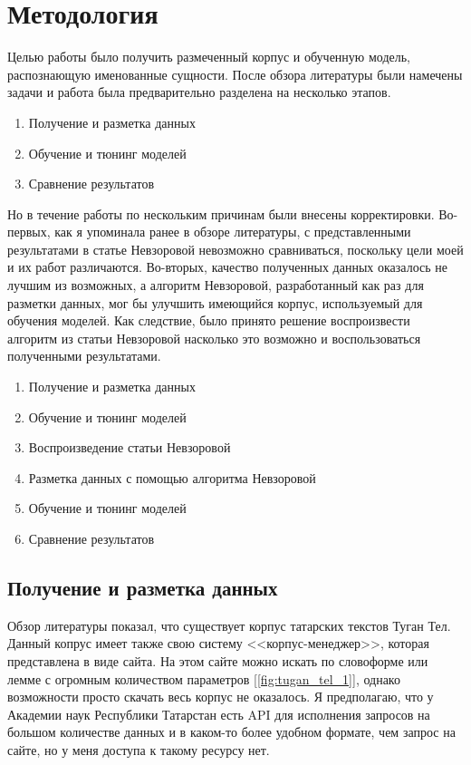 \section{Методология}

Целью работы было получить размеченный корпус и обученную модель, распознающую именованные сущности. После обзора литературы были намечены задачи и работа была предварительно разделена на несколько этапов.

\begin{enumerate}
\item Получение и разметка данных
\item Обучение и тюнинг моделей
\item Сравнение результатов
\end{enumerate}

Но в течение работы по нескольким причинам были внесены корректировки. Во-первых, как я упоминала ранее в обзоре литературы, с представленными результатами в статье Невзоровой невозможно сравниваться, поскольку цели моей и их работ различаются. Во-вторых, качество полученных данных оказалось не лучшим из возможных, а алгоритм Невзоровой, разработанный как раз для разметки данных, мог бы улучшить имеющийся корпус, используемый для обучения моделей. Как следствие, было принято решение воспроизвести алгоритм из статьи Невзоровой насколько это возможно и воспользоваться полученными результатами.

\begin{enumerate}
\item Получение и разметка данных
\item Обучение и тюнинг моделей
\item Воспроизведение статьи Невзоровой
\item Разметка данных с помощью алгоритма Невзоровой
\item Обучение и тюнинг моделей
\item Сравнение результатов
\end{enumerate}


\subsection{Получение и разметка данных}

Обзор литературы показал, что существует корпус татарских текстов Туган Тел\cite{tugan_tel}. Данный копрус имеет также свою систему <<корпус-менеджер>>, которая представлена в виде сайта. На этом сайте можно искать по словоформе или лемме с огромным количеством параметров [\ref{fig:tugan_tel_1}], однако возможности просто скачать весь корпус не оказалось. Я предполагаю, что у Академии наук Республики Татарстан есть API для исполнения запросов на большом количестве данных и в каком-то более удобном формате, чем запрос на сайте, но у меня доступа к такому ресурсу нет. 

